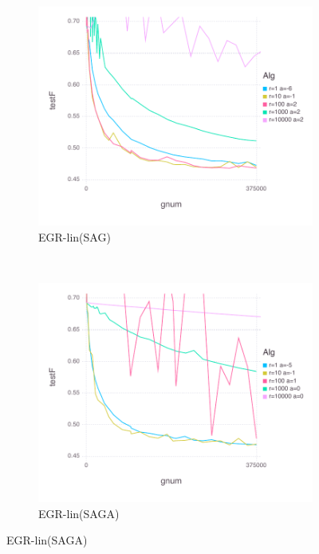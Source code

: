 \documentclass[11pt]{article}
\begin{document}
      \begin{figure}[H]
          \centering
   \begin{subfigure}[b]{0.45\textwidth}
              \includegraphics[width=\textwidth]{Figures/alphaGoodBLtrueffFinal-linfalse.pdf}
              \caption{EGR-lin(SAG)}
          \end{subfigure}
          ~ %
          \begin{subfigure}[b]{0.45\textwidth}
              \includegraphics[width=\textwidth]{Figures/alphaGoodBLtrueffFinal-lintrue.pdf}
              \caption{EGR-lin(SAGA)} 
          \end{subfigure}
	   

\end{figure}
\end{document}
